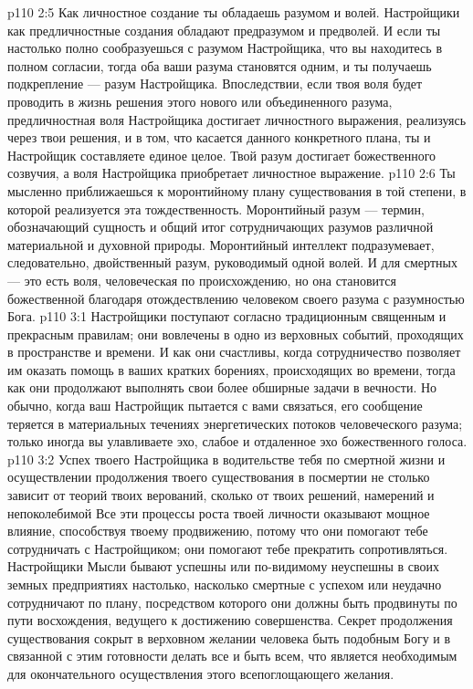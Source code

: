 \vs p110 2:5 \pc Как личностное создание ты обладаешь разумом и волей. Настройщики как предличностные создания обладают предразумом и предволей. И если ты настолько полно сообразуешься с разумом Настройщика, что вы находитесь в полном согласии, тогда оба ваши разума становятся одним, и ты получаешь подкрепление --- разум Настройщика. Впоследствии, если твоя воля будет проводить в жизнь решения этого нового или объединенного разума, предличностная воля Настройщика достигает личностного выражения, реализуясь через твои решения, и в том, что касается данного конкретного плана, ты и Настройщик составляете единое целое. Твой разум достигает божественного созвучия, а воля Настройщика приобретает личностное выражение.
\vs p110 2:6 Ты мысленно приближаешься к моронтийному плану существования в той степени, в которой реализуется эта тождественность. Моронтийный разум --- термин, обозначающий сущность и общий итог сотрудничающих разумов различной материальной и духовной природы. Моронтийный интеллект подразумевает, следовательно, двойственный разум, руководимый одной волей. И для смертных --- это есть воля, человеческая по происхождению, но она становится божественной благодаря отождествлению человеком своего разума с разумностью Бога.
\vs p110 3:1 Настройщики поступают согласно традиционным священным и прекрасным правилам; они вовлечены в одно из верховных событий, проходящих в пространстве и времени. И как они счастливы, когда сотрудничество позволяет им оказать помощь в ваших кратких борениях, происходящих во времени, тогда как они продолжают выполнять свои более обширные задачи в вечности. Но обычно, когда ваш Настройщик пытается с вами связаться, его сообщение теряется в материальных течениях энергетических потоков человеческого разума; только иногда вы улавливаете эхо, слабое и отдаленное эхо божественного голоса.
\vs p110 3:2 Успех твоего Настройщика в водительстве тебя по смертной жизни и осуществлении продолжения твоего существования в посмертии не столько зависит от теорий твоих верований, сколько от твоих решений, намерений и непоколебимой  Все эти процессы роста твоей личности оказывают мощное влияние, способствуя твоему продвижению, потому что они помогают тебе сотрудничать с Настройщиком; они помогают тебе прекратить сопротивляться. Настройщики Мысли бывают успешны или по\hyp{}видимому неуспешны в своих земных предприятиях настолько, насколько смертные с успехом или неудачно сотрудничают по плану, посредством которого они должны быть продвинуты по пути восхождения, ведущего к достижению совершенства. Секрет продолжения существования сокрыт в верховном желании человека быть подобным Богу и в связанной с этим готовности делать все и быть всем, что является необходимым для окончательного осуществления этого всепоглощающего желания.
